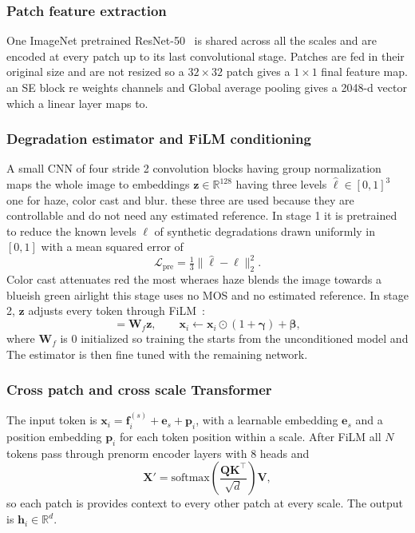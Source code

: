 \documentclass[conference]{IEEEtran}
\begin{document}
\subsubsection{Patch feature extraction}
One ImageNet pretrained ResNet-50~\cite{he2016resnet} is shared across all the scales and are encoded at every patch up to its last convolutional stage. Patches are fed in their original size and are not resized so a $32\times32$ patch gives a $1\times1$ final feature map. an SE block re weights channels and Global average pooling gives a 2048-d vector which a linear layer maps to.
\vspace{0.2cm}
\subsubsection{Degradation estimator and FiLM conditioning}
A small CNN of four stride 2 convolution blocks having group normalization maps the whole image to embeddings $\mathbf{z}\in\mathbb{R}^{128}$ having three levels $\hat{\boldsymbol{\ell}}\in[0,1]^3$ one for haze, color cast  and blur. these three are used because they are controllable and do not need any estimated reference. In stage 1 it is pretrained to reduce the known levels $\boldsymbol{\ell}$ of synthetic degradations drawn uniformly in $[0,1]$  with a mean squared error of
\begin{equation}
\mathcal{L}_{\text{pre}}=\tfrac{1}{3}\lVert \hat{\boldsymbol{\ell}}-\boldsymbol{\ell}\rVert_2^2 .
\end{equation}
Color cast attenuates red the most wheraes haze blends the image towards a blueish green airlight this stage uses no MOS and no estimated reference. In stage 2, $\mathbf{z}$ adjusts every token through FiLM~\cite{perez2018film}:
\begin{equation}
[\boldsymbol{\gamma},\boldsymbol{\beta}]=\mathbf{W}_f\mathbf{z},\qquad
\mathbf{x}_i\leftarrow \mathbf{x}_i\odot(1+\boldsymbol{\gamma})+\boldsymbol{\beta},
\end{equation}
where $\mathbf{W}_f$ is 0 initialized so training the starts from the unconditioned model and  The estimator is then fine tuned with the remaining network. 
\vspace{0.2cm}
\subsubsection{Cross patch and cross scale Transformer}
The input token is $\mathbf{x}_i=\mathbf{f}_i^{(s)}+\mathbf{e}_s+\mathbf{p}_i$, with a learnable embedding $\mathbf{e}_s$ and a position embedding $\mathbf{p}_i$ for each token position within a scale. After FiLM all $N$ tokens pass through prenorm encoder layers with 8 heads and
\begin{equation}
\mathbf{X}'=\mathrm{softmax}\!\left(\frac{\mathbf{Q}\mathbf{K}^{\top}}{\sqrt{d}}\right)\mathbf{V},
\end{equation}
so each patch is provides context to every other patch at every scale. The output is $\mathbf{h}_i\in\mathbb{R}^{d}$.
\vspace{0.2cm}
\end{document}
